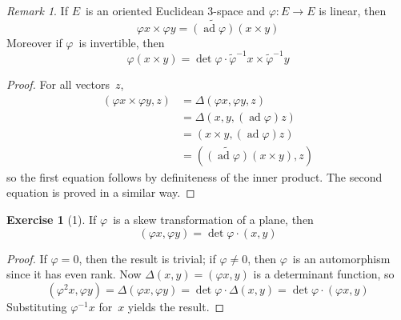 \documentclass[letterpaper,12pt]{article}
\DeclareMathOperator{\ad}{ad}
\newcommand{\mult}{\cdot}
\newcommand{\cross}{\times}
\newcommand{\iprod}[2]{(#1,#2)}
\newcommand{\adj}[1]{\widetilde{#1}}
\theoremstyle{definition}
\newtheorem*{exer}{Exercise}
\theoremstyle{remark}
\newtheorem*{rmk}{Remark}
\begin{document}
\begin{rmk}
If \(E\)~is an oriented Euclidean \(3\)-space and \(\varphi:E\to E\) is linear, then
\[\varphi x\cross\varphi y=\adj{(\ad\varphi)}(x\cross y)\]
Moreover if \(\varphi\)~is invertible, then
\[\varphi(x\cross y)=\det\varphi\mult\adj{\varphi}^{-1}x\cross\adj{\varphi}^{-1}y\]
\end{rmk}
\begin{proof}
For all vectors~\(z\),
\begin{align*}
\iprod{\varphi x\cross\varphi y}{z}&=\Delta(\varphi x,\varphi y,z)\\
	&=\Delta(x,y,(\ad\varphi)z)\\
	&=\iprod{x\cross y}{(\ad\varphi)z}\\
	&=\iprod{\adj{(\ad\varphi)}(x\cross y)}{z}
\end{align*}
so the first equation follows by definiteness of the inner product. The second equation is proved in a similar way.
\end{proof}

\begin{exer}[1]
If \(\varphi\)~is a skew transformation of a plane, then
\[\iprod{\varphi x}{\varphi y}=\det\varphi\mult\iprod{x}{y}\]
\end{exer}
\begin{proof}
If \(\varphi=0\), then the result is trivial; if \(\varphi\ne 0\), then \(\varphi\)~is an automorphism since it has even rank. Now \(\Delta(x,y)=\iprod{\varphi x}{y}\) is a determinant function, so
\[\iprod{\varphi^2 x}{\varphi y}=\Delta(\varphi x,\varphi y)=\det\varphi\mult\Delta(x,y)=\det\varphi\mult\iprod{\varphi x}{y}\]
Substituting \(\varphi^{-1}x\) for~\(x\) yields the result.
\end{proof}
\end{document}
